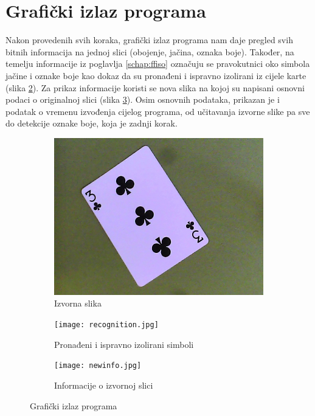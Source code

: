 \documentclass[times, zavrsni, numeric, utf8]{fer}
\begin{document}
\section{Grafički izlaz programa}
\hspace*{0.5cm}Nakon provedenih svih koraka, grafički izlaz programa nam daje pregled svih bitnih informacija na jednoj slici (obojenje, jačina, oznaka boje). Također, na temelju informacije iz poglavlja \ref{schap:ffiso} označuju se pravokutnici oko simbola jačine i oznake boje kao dokaz da su pronađeni i ispravno izolirani iz cijele karte (slika \ref{fig:recognition}). Za prikaz informacije koristi se nova slika na kojoj su napisani osnovni podaci o originalnoj slici (slika \ref{fig:info}). Osim osnovnih podataka, prikazan je i podatak o vremenu izvođenja cijelog programa, od učitavanja izvorne slike pa sve do detekcije oznake boje, koja je zadnji korak. 
\begin{figure}[H]
\begin{subfigure}{.5\textwidth}
  \centering
  \includegraphics[width=0.8\linewidth]{sve-karte/img11.jpg}
  \caption{Izvorna slika}
  \label{fig:sourceimg}
\end{subfigure}%
\begin{subfigure}{.5\textwidth}
  \centering
  \texttt{[image: recognition.jpg]}
  \caption{Pronađeni i ispravno izolirani simboli}
  \label{fig:recognition}
\end{subfigure}
\begin{center}
\begin{subfigure}{.5\textwidth}
  \centering
  \texttt{[image: newinfo.jpg]}
  \caption{Informacije o izvornoj slici}
  \label{fig:info}
\end{subfigure}
\end{center}
\caption{Grafički izlaz programa}
\label{fig:guioutput}
\end{figure}
\end{document}
